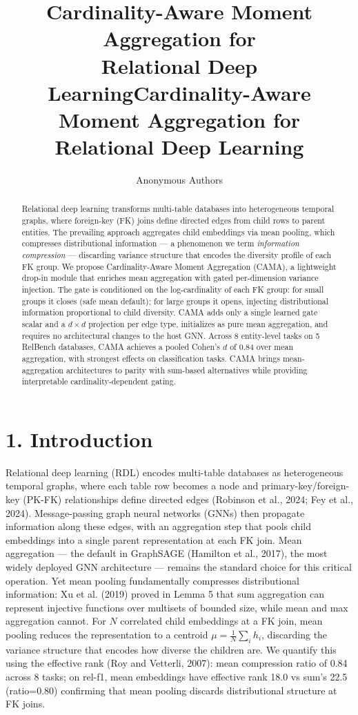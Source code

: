 \documentclass[final]{article}
\title{Cardinality-Aware Moment Aggregation for\\Relational Deep Learning}
\author{Anonymous Authors}
\date{}
\begin{document}
\maketitle

\begin{abstract}
Relational deep learning transforms multi-table databases into heterogeneous temporal graphs, where foreign-key (FK) joins define directed edges from child rows to parent entities. The prevailing approach aggregates child embeddings via mean pooling, which compresses distributional information --- a phenomenon we term \textit{information compression} --- discarding variance structure that encodes the diversity profile of each FK group. We propose Cardinality-Aware Moment Aggregation (CAMA), a lightweight drop-in module that enriches mean aggregation with gated per-dimension variance injection. The gate is conditioned on the log-cardinality of each FK group: for small groups it closes (safe mean default); for large groups it opens, injecting distributional information proportional to child diversity. CAMA adds only a single learned gate scalar and a $d \times d$ projection per edge type, initializes as pure mean aggregation, and requires no architectural changes to the host GNN. Across 8 entity-level tasks on 5 RelBench databases, CAMA achieves a pooled Cohen's $d$ of 0.84 over mean aggregation, with strongest effects on classification tasks. CAMA brings mean-aggregation architectures to parity with sum-based alternatives while providing interpretable cardinality-dependent gating.
\end{abstract}

\title{Cardinality-Aware Moment Aggregation for Relational Deep Learning}

\section{1. Introduction}

Relational deep learning (RDL) encodes multi-table databases as heterogeneous temporal graphs, where each table row becomes a node and primary-key/foreign-key (PK-FK) relationships define directed edges (Robinson et al., 2024; Fey et al., 2024). Message-passing graph neural networks (GNNs) then propagate information along these edges, with an aggregation step that pools child embeddings into a single parent representation at each FK join. Mean aggregation --- the default in GraphSAGE (Hamilton et al., 2017), the most widely deployed GNN architecture --- remains the standard choice for this critical operation. Yet mean pooling fundamentally compresses distributional information: Xu et al. (2019) proved in Lemma 5 that sum aggregation can represent injective functions over multisets of bounded size, while mean and max aggregation cannot. For $N$ correlated child embeddings at a FK join, mean pooling reduces the representation to a centroid $\mu = \frac{1}{N}\sum_i h_i$, discarding the variance structure that encodes how diverse the children are. We quantify this using the effective rank (Roy and Vetterli, 2007): mean compression ratio of 0.84 across 8 tasks; on rel-f1, mean embeddings have effective rank 18.0 vs sum's 22.5 (ratio=0.80) confirming that mean pooling discards distributional structure at FK joins.
\end{document}
